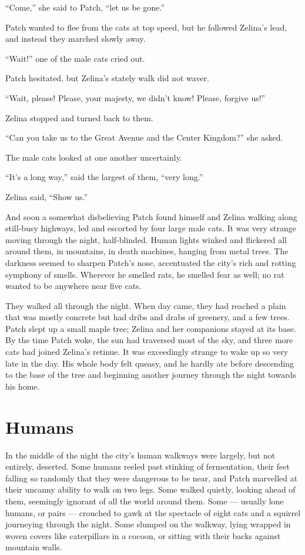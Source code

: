 \documentclass[ebook,oneside,openany,17pt]{memoir}
\newenvironment{tolerant}[1]{%
  \par\tolerance=#1\relax
}{%
  \par
}
\renewcommand{\thechapter}{\Roman{chapter}}
\newcounter{sections}
\newcommand{\sections}[1]{%
  \section*{#1}
  \addtocounter{sections}{1}%
  \pdfbookmark[1]{#1}{section.\thechapter.\thesections}}
\begin{document}
“Come,” she said to Patch, “let us be gone.”

Patch wanted to flee from the cats at top speed, but he followed
Zelina’s lead, and instead they march\-ed slowly away.

“Wait!” one of the male cats cried out.

Patch hesitated, but Zelina’s stately walk did not waver.

\begin{tolerant}{1000}
“Wait, please! Please, your majesty, we didn’t know! Please, forgive
us!”
\end{tolerant}

Zelina stopped and turned back to them.

“Can you take us to the Great Avenue and the Center Kingdom?” she
asked.

The male cats looked at one another uncertainly.

“It’s a long way,” said the largest of them, “very long.”

Zelina said, “Show us.”

\begin{tolerant}{5000}
And soon a somewhat disbelieving Patch found himself and Zelina
walking along still-busy highways, led and escorted by four large male
cats. It was very strange moving through the night,
half-blinded. Human lights winked and flickered all around them, in
mountains, in death machines, hanging from metal trees. The darkness
seemed to sharpen Patch’s nose, accentuated the city’s rich and
rotting symphony of smells. Wherever he smelled rats, he smelled fear
as well; no rat wanted to be anywhere near five cats.
\end{tolerant}

They walked all through the night. When day came, they had reached a
plain that was mostly concrete but had dribs and drabs of greenery,
and a few trees. Patch slept up a small maple tree; Zelina and her
companions stayed at its base. By the time Patch woke, the sun had
traversed most of the sky, and three more cats had joined Zelina’s
retinue. It was exceedingly strange to wake up so very late in the
day. His whole body felt queasy, and he hardly ate before descending
to the base of the tree and beginning another journey through the
night towards his home.


\sections{Humans}

In the middle of the night the city’s human walkways were largely, but
not entirely, deserted. Some humans reeled past stinking of
fermentation, their feet falling so randomly that they were dangerous
to be near, and Patch marvelled at their uncanny ability to walk on
two legs. Some walked quietly, looking ahead of them, seemingly
ignorant of all the world around them. Some — usually lone humans, or
pairs — crouched to gawk at the spectacle of eight cats and a squirrel
journeying through the night. Some slumped on the walkway, lying
wrapped in woven covers like caterpillars in a cocoon, or sitting with
their backs against mountain walls.
\end{document}
